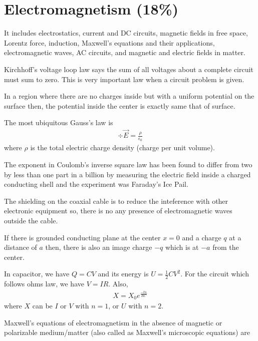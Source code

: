 
\section{Electromagnetism (18\%)}

It includes electrostatics, current and DC circuits, magnetic fields in free space, Lorentz force, induction, Maxwell's equations and their applications, electromagnetic waves, AC circuits, and magnetic and electric fields in matter.


Kirchhoff's voltage loop law says the sum of all voltages about a complete circuit must sum to zero. This is very important law when a circuit problem is given.

In a region where there are no charges inside but with a uniform potential on the surface then, the potential inside the center is exactly same that of surface.

The most ubiquitous Gauss's law is
\begin{align*}
\div\vec{E} = \frac{\rho}{\epsilon_{0}} 
\end{align*}
 where $\rho$ is the total electric charge density (charge per unit volume).
 
The exponent in Coulomb's inverse square law has been found to differ from two by less than one part in a billion by measuring the electric field inside a charged conducting shell and the experiment was Faraday's Ice Pail.

The shielding on the coaxial cable is to reduce the inteference with other electronic equipment so, there is no any presence of electromagnetic waves outside the cable.

If there is grounded conducting plane at the center $x = 0$ and a charge $q$ at a distance of $a$ then, there is also an image charge $-q$ which is at $-a$ from the center.

In capacitor, we have $Q = C V$ and its energy is $U = \frac{1}{2} C V^{2}$. For the circuit which follows ohms law, we have $V = I R$. Also,
\begin{align}
X = X_{0} e^{\frac{-t n}{RC}}
\end{align}
where $X$ can be $I$ or $V$ with $n = 1$, or $U$ with $n = 2$.

Maxwell's equations of electromagnetism in the absence of magnetic or polarizable medium/matter (also called as Maxwell's microscopic equations) are

